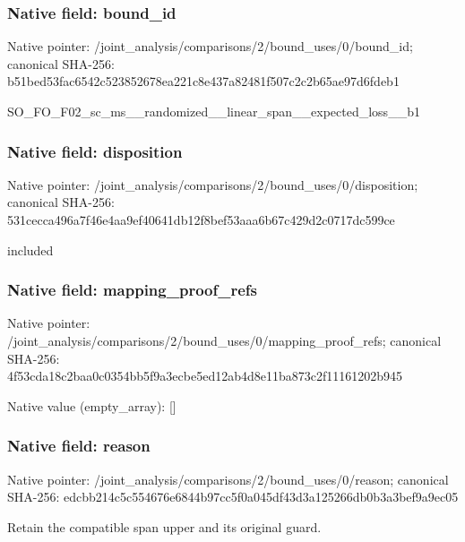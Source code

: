 \documentclass[10pt,a4paper]{article}
\begin{document}
\subsubsection{Native field: bound\_\allowbreak{}id}
Native pointer: /joint\_\allowbreak{}analysis/comparisons/2/bound\_\allowbreak{}uses/0/bound\_\allowbreak{}id; canonical SHA-256: b51bed53fac6542c523852678ea221c8e437a82481f507c2c2b65ae97d6fdeb1

\begingroup\raggedright\sloppy SO\_\allowbreak{}FO\_\allowbreak{}F02\_\allowbreak{}sc\_\allowbreak{}ms\_\allowbreak{}\_\allowbreak{}randomized\_\allowbreak{}\_\allowbreak{}linear\_\allowbreak{}span\_\allowbreak{}\_\allowbreak{}expected\_\allowbreak{}loss\_\allowbreak{}\_\allowbreak{}b1\par\endgroup

\subsubsection{Native field: disposition}
Native pointer: /joint\_\allowbreak{}analysis/comparisons/2/bound\_\allowbreak{}uses/0/disposition; canonical SHA-256: 531cecca496a7f46e4aa9ef40641db12f8bef53aaa6b67c429d2c0717dc599ce

\begingroup\raggedright\sloppy included\par\endgroup

\subsubsection{Native field: mapping\_\allowbreak{}proof\_\allowbreak{}refs}
Native pointer: /joint\_\allowbreak{}analysis/comparisons/2/bound\_\allowbreak{}uses/0/mapping\_\allowbreak{}proof\_\allowbreak{}refs; canonical SHA-256: 4f53cda18c2baa0c0354bb5f9a3ecbe5ed12ab4d8e11ba873c2f11161202b945

Native value (empty\_\allowbreak{}array): []

\subsubsection{Native field: reason}
Native pointer: /joint\_\allowbreak{}analysis/comparisons/2/bound\_\allowbreak{}uses/0/reason; canonical SHA-256: edcbb214c5c554676e6844b97cc5f0a045df43d3a125266db0b3a3bef9a9ec05

\begingroup\raggedright\sloppy Retain the compatible span upper and its original guard.\par\endgroup
\end{document}
